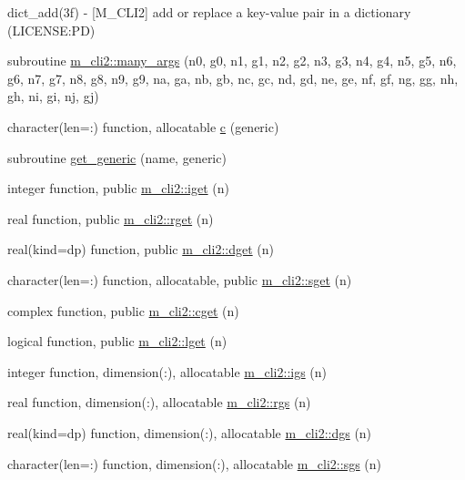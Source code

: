 \begin{DoxyCompactItemize}
\begin{DoxyCompactList}
dict\+\_\+add(3f) -\/ \mbox{[}M\+\_\+\+C\+L\+I2\mbox{]} add or replace a key-\/value pair in a dictionary (L\+I\+C\+E\+N\+SE\+:PD) \end{DoxyCompactList}\item 
subroutine \mbox{\hyperlink{namespacem__cli2_a2d1a2b245e9a5e5897e5bff0afc2a217}{m\+\_\+cli2\+::many\+\_\+args}} (n0, g0, n1, g1, n2, g2, n3, g3, n4, g4, n5, g5, n6, g6, n7, g7, n8, g8, n9, g9, na, ga, nb, gb, nc, gc, nd, gd, ne, ge, nf, gf, ng, gg, nh, gh, ni, gi, nj, gj)
\item 
character(len=\+:) function, allocatable \mbox{\hyperlink{M__CLI2_8f90_a8e39955a72727c584de84fedd23a25c4}{c}} (generic)
\item 
subroutine \mbox{\hyperlink{M__CLI2_8f90_a63bc2e1acc64ef4241b6419c18d80877}{get\+\_\+generic}} (name, generic)
\item 
integer function, public \mbox{\hyperlink{namespacem__cli2_a1b41630a5b78ed0fcb6b6df49ac7738d}{m\+\_\+cli2\+::iget}} (n)
\item 
real function, public \mbox{\hyperlink{namespacem__cli2_ade3a531cb1b2a60855ebe38031f7ed7a}{m\+\_\+cli2\+::rget}} (n)
\item 
real(kind=dp) function, public \mbox{\hyperlink{namespacem__cli2_abb63058af19a47e19a78567c4a320c16}{m\+\_\+cli2\+::dget}} (n)
\item 
character(len=\+:) function, allocatable, public \mbox{\hyperlink{namespacem__cli2_afb7e36674c50a0839bd4eae8301efefc}{m\+\_\+cli2\+::sget}} (n)
\item 
complex function, public \mbox{\hyperlink{namespacem__cli2_a753fbd0c09fbfd712c7f4add246818cf}{m\+\_\+cli2\+::cget}} (n)
\item 
logical function, public \mbox{\hyperlink{namespacem__cli2_a12c60a847f6ce11bd057e4fcc038a655}{m\+\_\+cli2\+::lget}} (n)
\item 
integer function, dimension(\+:), allocatable \mbox{\hyperlink{namespacem__cli2_a39e18c9b881ea554d6d0adee0f5a5313}{m\+\_\+cli2\+::igs}} (n)
\item 
real function, dimension(\+:), allocatable \mbox{\hyperlink{namespacem__cli2_ab526bbc0ccf60b19e298e49bf95e0595}{m\+\_\+cli2\+::rgs}} (n)
\item 
real(kind=dp) function, dimension(\+:), allocatable \mbox{\hyperlink{namespacem__cli2_a84bc83f5e8ec87f4d691e40df7569c83}{m\+\_\+cli2\+::dgs}} (n)
\item 
character(len=\+:) function, dimension(\+:), allocatable \mbox{\hyperlink{namespacem__cli2_aa4eb8a68238351ba1893f9ce555f5c49}{m\+\_\+cli2\+::sgs}} (n)

\end{DoxyCompactItemize}
